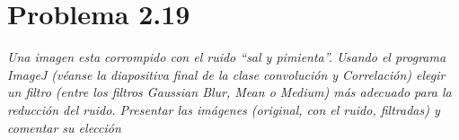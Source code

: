 \documentclass[../main/main.tex]{subfiles}
\begin{document}
\section*{Problema 2.19}

\emph{Una imagen esta corrompido con el ruido ``sal y pimienta''. Usando el programa ImageJ (véanse la diapositiva final de la clase convolución y Correlación) elegir un filtro (entre los filtros Gaussian Blur, Mean o Medium) más adecuado para la reducción del ruido. Presentar las imágenes (original, con el ruido, filtradas) y comentar su elección}
\end{document}
